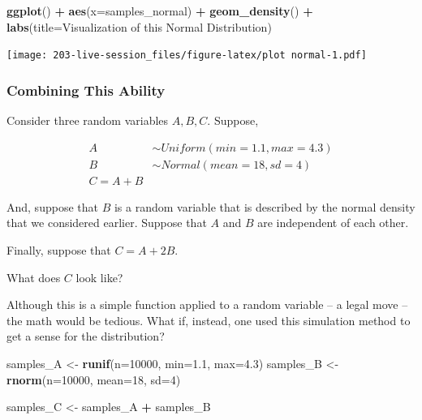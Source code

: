 \documentclass[
]{book}
\newenvironment{Shaded}{\begin{snugshade}}{\end{snugshade}}
\newcommand{\AttributeTok}[1]{\textcolor[rgb]{0.13,0.29,0.53}{#1}}
\newcommand{\DecValTok}[1]{\textcolor[rgb]{0.00,0.00,0.81}{#1}}
\newcommand{\FloatTok}[1]{\textcolor[rgb]{0.00,0.00,0.81}{#1}}
\newcommand{\FunctionTok}[1]{\textcolor[rgb]{0.13,0.29,0.53}{\textbf{#1}}}
\newcommand{\NormalTok}[1]{#1}
\newcommand{\OtherTok}[1]{\textcolor[rgb]{0.56,0.35,0.01}{#1}}
\newcommand{\SpecialCharTok}[1]{\textcolor[rgb]{0.81,0.36,0.00}{\textbf{#1}}}
\newcommand{\StringTok}[1]{\textcolor[rgb]{0.31,0.60,0.02}{#1}}
\theoremstyle{definition}
\theoremstyle{definition}
\theoremstyle{definition}
\theoremstyle{definition}
\theoremstyle{remark}
\begin{document}
\begin{Shaded}
\begin{Highlighting}[]
\FunctionTok{ggplot}\NormalTok{() }\SpecialCharTok{+} 
  \FunctionTok{aes}\NormalTok{(}\AttributeTok{x=}\NormalTok{samples\_normal) }\SpecialCharTok{+} 
  \FunctionTok{geom\_density}\NormalTok{() }\SpecialCharTok{+} 
  \FunctionTok{labs}\NormalTok{(}\AttributeTok{title=}\StringTok{\textquotesingle{}Visualization of this Normal Distribution\textquotesingle{}}\NormalTok{)}
\end{Highlighting}
\end{Shaded}

\texttt{[image: 203-live-session\_files/figure-latex/plot normal-1.pdf]}

\hypertarget{combining-this-ability}{%
\subsubsection{Combining This Ability}\label{combining-this-ability}}

Consider three random variables \(A, B, C\). Suppose,

\[ 
  \begin{aligned}
    A & \sim Uniform(min=1.1, max=4.3) \\ 
    B & \sim Normal(mean=18, sd=4)     \\ 
    C = A + B
  \end{aligned}
\]

And, suppose that \(B\) is a random variable that is described by the normal density that we considered earlier. Suppose that \(A\) and \(B\) are independent of each other.

Finally, suppose that \(C = A + 2B\).

What does \(C\) look like?

Although this is a simple function applied to a random variable -- a legal move -- the math would be tedious. What if, instead, one used this simulation method to get a sense for the distribution?

\begin{Shaded}
\begin{Highlighting}[]
\NormalTok{samples\_A }\OtherTok{\textless{}{-}} \FunctionTok{runif}\NormalTok{(}\AttributeTok{n=}\DecValTok{10000}\NormalTok{, }\AttributeTok{min=}\FloatTok{1.1}\NormalTok{, }\AttributeTok{max=}\FloatTok{4.3}\NormalTok{)}
\NormalTok{samples\_B }\OtherTok{\textless{}{-}} \FunctionTok{rnorm}\NormalTok{(}\AttributeTok{n=}\DecValTok{10000}\NormalTok{, }\AttributeTok{mean=}\DecValTok{18}\NormalTok{, }\AttributeTok{sd=}\DecValTok{4}\NormalTok{)}

\NormalTok{samples\_C }\OtherTok{\textless{}{-}}\NormalTok{ samples\_A }\SpecialCharTok{+}\NormalTok{ samples\_B}
\end{Highlighting}
\end{Shaded}
\end{document}
